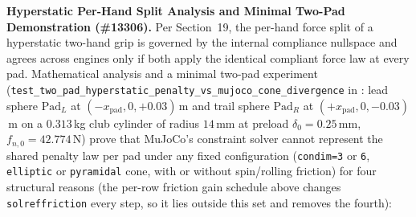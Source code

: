 \documentclass[11pt,a4paper]{article}
\begin{document}
\textbf{Hyperstatic Per-Hand Split Analysis and Minimal Two-Pad Demonstration (\#13306).} Per  Section~19, the per-hand force split of a hyperstatic two-hand grip is governed by the internal compliance nullspace and agrees across engines only if both apply the identical compliant force law at every pad. Mathematical analysis and a minimal two-pad experiment (\texttt{test\_two\_pad\_hyperstatic\_penalty\_vs\_mujoco\_cone\_divergence} in : lead sphere $\mathrm{Pad}_L$ at $(-x_{\mathrm{pad}}, 0, +0.03)$\,m and trail sphere $\mathrm{Pad}_R$ at $(+x_{\mathrm{pad}}, 0, -0.03)$\,m on a $0.313$\,kg club cylinder of radius $14$\,mm at preload $\delta_0 = 0.25$\,mm, $f_{n,0} = 42.774$\,N) prove that MuJoCo's constraint solver cannot represent the shared penalty law per pad under any fixed configuration (\texttt{condim=3} or \texttt{6}, \texttt{elliptic} or \texttt{pyramidal} cone, with or without spin/rolling friction) for four structural reasons (the per-row friction gain schedule above changes \texttt{solreffriction} every step, so it lies outside this set and removes the fourth):
\end{document}
